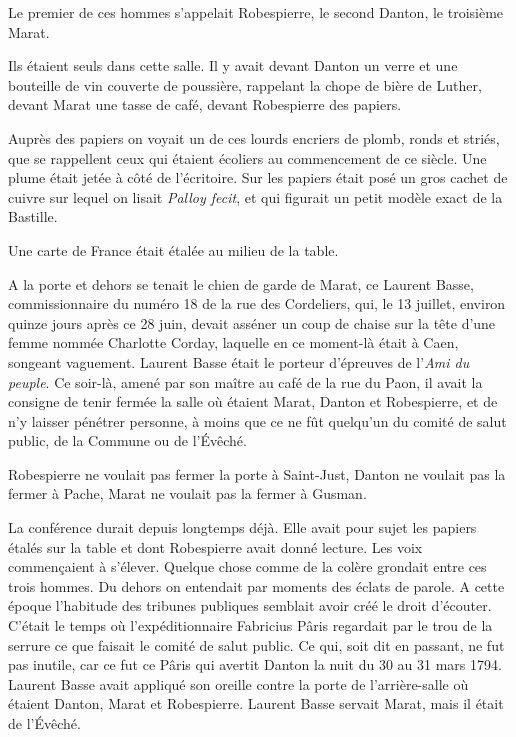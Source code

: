 \documentclass[french,twoside]{book} %
\begin{document}
Le premier de ces hommes s’appelait Robespierre, le second Danton, le troisième Marat.\par
Ils étaient seuls dans cette salle. Il y avait devant Danton un verre et une bouteille de vin couverte de poussière, rappelant la chope de bière de Luther, devant Marat une tasse de café, devant Robespierre des papiers.\par
Auprès des papiers on voyait un de ces lourds encriers de plomb, ronds et striés, que se rappellent ceux qui étaient écoliers au commencement de ce siècle. Une plume était jetée à côté de l’écritoire. Sur les papiers était posé un gros cachet de cuivre sur lequel on lisait \emph{Palloy fecit}, et qui figurait un petit modèle exact de la Bastille.\par
Une carte de France était étalée au milieu de la table.\par
A la porte et dehors se tenait le chien de garde de Marat, ce Laurent Basse, commissionnaire du numéro 18 de la rue des Cordeliers, qui, le 13 juillet, environ quinze jours après ce 28 juin, devait asséner un coup de chaise sur la tête d’une femme nommée Charlotte Corday, laquelle en ce moment-là était à Caen, songeant vaguement. Laurent Basse était le porteur d’épreuves de l’\emph{Ami du peuple}. Ce soir-là, amené par son maître au café de la rue du Paon, il avait la consigne de tenir fermée la salle où étaient Marat,  Danton et Robespierre, et de n’y laisser pénétrer personne, à moins que ce ne fût quelqu’un du comité de salut public, de la Commune ou de l’Évêché.\par
Robespierre ne voulait pas fermer la porte à Saint-Just, Danton ne voulait pas la fermer à Pache, Marat ne voulait pas la fermer à Gusman.\par
La conférence durait depuis longtemps déjà. Elle avait pour sujet les papiers étalés sur la table et dont Robespierre avait donné lecture. Les voix commençaient à s’élever. Quelque chose comme de la colère grondait entre ces trois hommes. Du dehors on entendait par moments des éclats de parole. A cette époque l’habitude des tribunes publiques semblait avoir créé le droit d’écouter. C’était le temps où l’expéditionnaire Fabricius Pâris regardait par le trou de la serrure ce que faisait le comité de salut public. Ce qui, soit dit en passant, ne fut pas inutile, car ce fut ce Pâris qui avertit Danton la nuit du 30 au 31 mars 1794. Laurent Basse avait appliqué son oreille contre la porte de l’arrière-salle où étaient Danton, Marat et Robespierre. Laurent Basse servait Marat, mais il était de l’Évêché.
\end{document}
